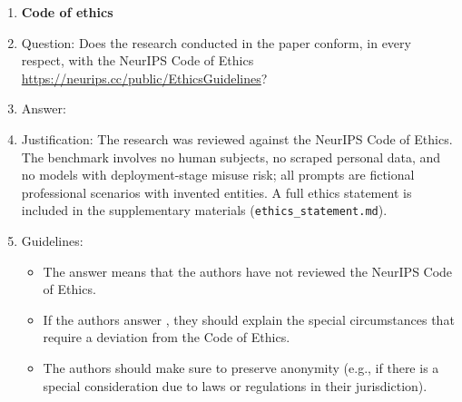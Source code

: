 \begin{enumerate}
\item {\bf Code of ethics}
    \item[] Question: Does the research conducted in the paper conform, in every respect, with the NeurIPS Code of Ethics \url{https://neurips.cc/public/EthicsGuidelines}?
    \item[] Answer: \answerYes{}
    \item[] Justification: The research was reviewed against the NeurIPS Code of Ethics. The benchmark involves no human subjects, no scraped personal data, and no models with deployment-stage misuse risk; all prompts are fictional professional scenarios with invented entities. A full ethics statement is included in the supplementary materials (\texttt{ethics\_statement.md}).
    \item[] Guidelines:
    \begin{itemize}
        \item The answer \answerNA{} means that the authors have not reviewed the NeurIPS Code of Ethics.
        \item If the authors answer \answerNo, they should explain the special circumstances that require a deviation from the Code of Ethics.
        \item The authors should make sure to preserve anonymity (e.g., if there is a special consideration due to laws or regulations in their jurisdiction).
    \end{itemize}



\end{enumerate}
